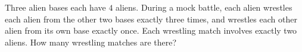 Three alien bases each have $4$ aliens. During a mock battle, each alien wrestles each alien from the other two bases exactly three times, and wrestles each other alien from its own base exactly once. Each wrestling match involves exactly two aliens. How many wrestling matches are there?
